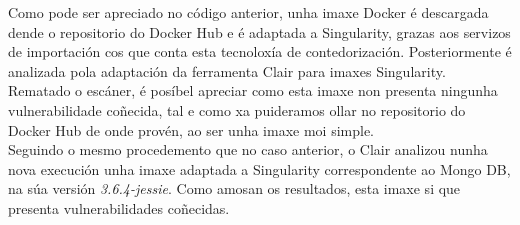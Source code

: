 Como pode ser apreciado no código anterior, unha imaxe Docker é descargada dende o repositorio do Docker Hub e é adaptada a Singularity, grazas aos servizos de importación cos que conta esta tecnoloxía de contedorización. Posteriormente é analizada pola adaptación da ferramenta Clair para imaxes Singularity. Rematado o escáner, é posíbel apreciar como esta imaxe non presenta ningunha vulnerabilidade coñecida, tal e como xa puideramos ollar no repositorio do Docker Hub de onde provén, ao ser unha imaxe moi simple.\\

Seguindo o mesmo procedemento que no caso anterior, o Clair analizou nunha nova execución unha imaxe adaptada a Singularity correspondente ao Mongo DB, na súa versión \textit{3.6.4-jessie}. Como amosan os resultados, esta imaxe si que presenta vulnerabilidades coñecidas.

